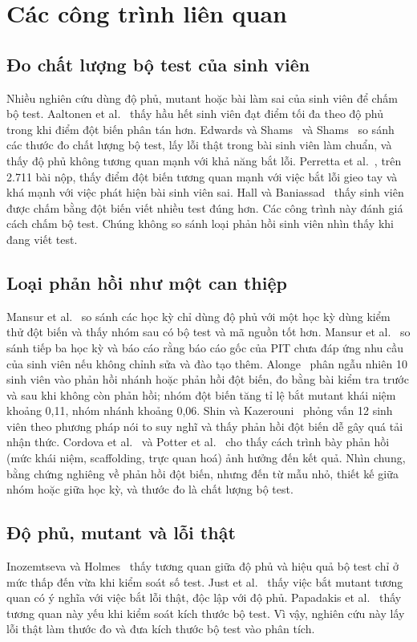 \section{Các công trình liên quan}
\label{sec:related}

\subsection{Đo chất lượng bộ test của sinh viên}
Nhiều nghiên cứu dùng độ phủ, mutant hoặc bài làm sai của sinh viên để chấm bộ test. Aaltonen et al.~\cite{aaltonen2010} thấy hầu hết sinh viên đạt điểm tối đa theo độ phủ trong khi điểm đột biến phân tán hơn. Edwards và Shams~\cite{edwards2014} và Shams~\cite{shams2015} so sánh các thước đo chất lượng bộ test, lấy lỗi thật trong bài sinh viên làm chuẩn, và thấy độ phủ không tương quan mạnh với khả năng bắt lỗi. Perretta et al.~\cite{perretta2022}, trên 2.711 bài nộp, thấy điểm đột biến tương quan mạnh với việc bắt lỗi gieo tay và khá mạnh với việc phát hiện bài sinh viên sai. Hall và Baniassad~\cite{hall2022} thấy sinh viên được chấm bằng đột biến viết nhiều test đúng hơn. Các công trình này đánh giá cách chấm bộ test. Chúng không so sánh loại phản hồi sinh viên nhìn thấy khi đang viết test.

\subsection{Loại phản hồi như một can thiệp}
Mansur et al.~\cite{mansur2024} so sánh các học kỳ chỉ dùng độ phủ với một học kỳ dùng kiểm thử đột biến và thấy nhóm sau có bộ test và mã nguồn tốt hơn. Mansur et al.~\cite{mansur2026} so sánh tiếp ba học kỳ và báo cáo rằng báo cáo gốc của PIT chưa đáp ứng nhu cầu của sinh viên nếu không chỉnh sửa và đào tạo thêm. Alonge~\cite{alonge2025} phân ngẫu nhiên 10 sinh viên vào phản hồi nhánh hoặc phản hồi đột biến, đo bằng bài kiểm tra trước và sau khi không còn phản hồi; nhóm đột biến tăng tỉ lệ bắt mutant khái niệm khoảng 0,11, nhóm nhánh khoảng 0,06. Shin và Kazerouni~\cite{shin2024} phỏng vấn 12 sinh viên theo phương pháp nói to suy nghĩ và thấy phản hồi đột biến dễ gây quá tải nhận thức. Cordova et al.~\cite{cordova2021} và Potter et al.~\cite{potter2025} cho thấy cách trình bày phản hồi (mức khái niệm, scaffolding, trực quan hoá) ảnh hưởng đến kết quả. Nhìn chung, bằng chứng nghiêng về phản hồi đột biến, nhưng đến từ mẫu nhỏ, thiết kế giữa nhóm hoặc giữa học kỳ, và thước đo là chất lượng bộ test.

\subsection{Độ phủ, mutant và lỗi thật}
Inozemtseva và Holmes~\cite{inozemtseva2014} thấy tương quan giữa độ phủ và hiệu quả bộ test chỉ ở mức thấp đến vừa khi kiểm soát số test. Just et al.~\cite{just2014} thấy việc bắt mutant tương quan có ý nghĩa với việc bắt lỗi thật, độc lập với độ phủ. Papadakis et al.~\cite{papadakis2018} thấy tương quan này yếu khi kiểm soát kích thước bộ test. Vì vậy, nghiên cứu này lấy lỗi thật làm thước đo và đưa kích thước bộ test vào phân tích.

